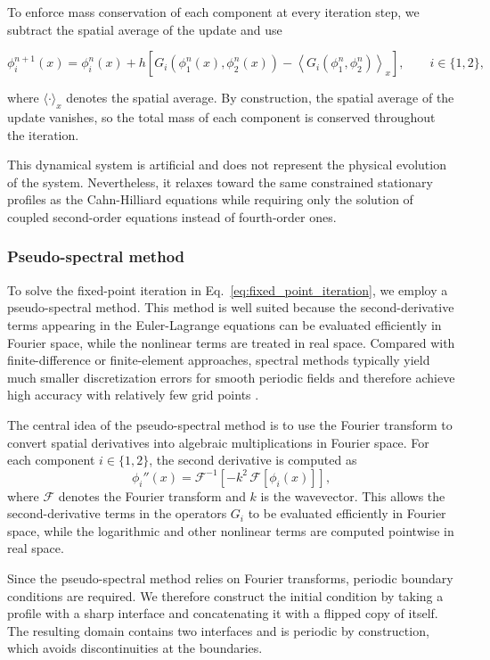 \documentclass[12pt]{article}
\begin{document}
To enforce mass conservation of each component at every iteration step, we subtract the spatial average of the update and use

\begin{equation}
\phi_i^{n+1}(x)
=
\phi_i^n(x)
+
h\left[
G_i(\phi_1^n(x),\phi_2^n(x))
-
\left\langle G_i(\phi_1^n,\phi_2^n)\right\rangle_x
\right],
\qquad i\in\{1,2\},
\label{eq:fixed_point_iteration}
\end{equation}

where \(\langle\cdot\rangle_x\) denotes the spatial average. By construction, the spatial average of the update vanishes, so the total mass of each component is conserved throughout the iteration.

This dynamical system is artificial and does not represent the physical evolution of the system. Nevertheless, it relaxes toward the same constrained stationary profiles as the Cahn-Hilliard equations while requiring only the solution of coupled second-order equations instead of fourth-order ones.

\subsubsection{Pseudo-spectral method}

To solve the fixed-point iteration in Eq.~\eqref{eq:fixed_point_iteration}, we employ a pseudo-spectral method.
This method is well suited because the second-derivative terms appearing in the Euler-Lagrange equations can be evaluated efficiently in Fourier space, while the nonlinear terms are treated in real space.
Compared with finite-difference or finite-element approaches, spectral methods typically yield much smaller discretization errors for smooth periodic fields and therefore achieve high accuracy with relatively few grid points \cite[Chs.~1.1--1.4]{Boyd2000Chebyshev}.

The central idea of the pseudo-spectral method is to use the Fourier transform to convert spatial derivatives into algebraic multiplications in Fourier space. For each component \(i\in\{1,2\}\), the second derivative is computed as
\[
\phi_i''(x)
=
\mathcal{F}^{-1}\!\left[-k^2\,\mathcal{F}[\phi_i(x)]\right],
\]
where \(\mathcal{F}\) denotes the Fourier transform and \(k\) is the wavevector. This allows the second-derivative terms in the operators \(G_i\) to be evaluated efficiently in Fourier space, while the logarithmic and other nonlinear terms are computed pointwise in real space.

Since the pseudo-spectral method relies on Fourier transforms, periodic boundary conditions are required. 
We therefore construct the initial condition by taking a profile with a sharp interface and concatenating it with a flipped copy of itself.
The resulting domain contains two interfaces and is periodic by construction, which avoids discontinuities at the boundaries.
\end{document}
